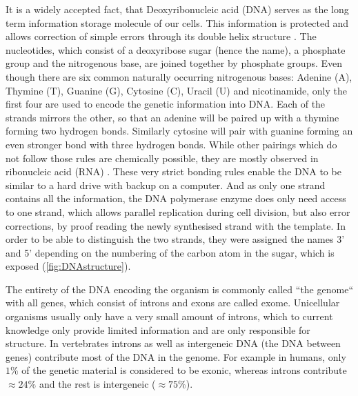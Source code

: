 It is a widely accepted fact, that Deoxyribonucleic acid (DNA) serves as the long term information storage molecule of our cells. This information is protected and allows correction of simple errors through its double helix structure \cite{Watson1953,Liang1998}. The nucleotides, which consist of a deoxyribose sugar (hence the name), a phosphate group and the nitrogenous base, are joined together by phosphate groups. Even though there are six common naturally occurring nitrogenous bases: Adenine (A), Thymine (T), Guanine (G), Cytosine (C), Uracil (U) and nicotinamide, only the first four are used to encode the genetic information into DNA. Each of the strands mirrors the other, so that an adenine will be paired up with a thymine forming two hydrogen bonds. Similarly cytosine will pair with guanine forming an even stronger bond with three hydrogen bonds. While other pairings which do not follow those rules are chemically possible, they are mostly observed in ribonucleic acid (RNA) \cite{Sinden1994}. These very strict bonding rules enable the DNA to be similar to a hard drive with backup on a computer. And as only one strand contains all the information, the DNA polymerase enzyme does only need access to one strand, which allows parallel replication during cell division, but also error corrections, by proof reading the newly synthesised strand with the template. In order to be able to distinguish the two strands, they were assigned the names 3' and 5' depending on the numbering of the carbon atom in the sugar, which is exposed (\autoref{fig:DNAstructure}).

The entirety of the DNA encoding the organism is commonly called ``the genome`` with all genes, which consist of introns and exons are called exome. Unicellular organisms usually only have a very small amount of introns, which to current knowledge only provide limited information and are only responsible for structure. In vertebrates  introns as well as intergeneic DNA (the DNA between genes) contribute most of the DNA in the genome. For example in humans, only $1\%$ of the genetic material is considered to be exonic, whereas introns contribute $\approx 24\%$ and the rest is intergeneic ($\approx 75\%$)\cite{Venter2001}.


